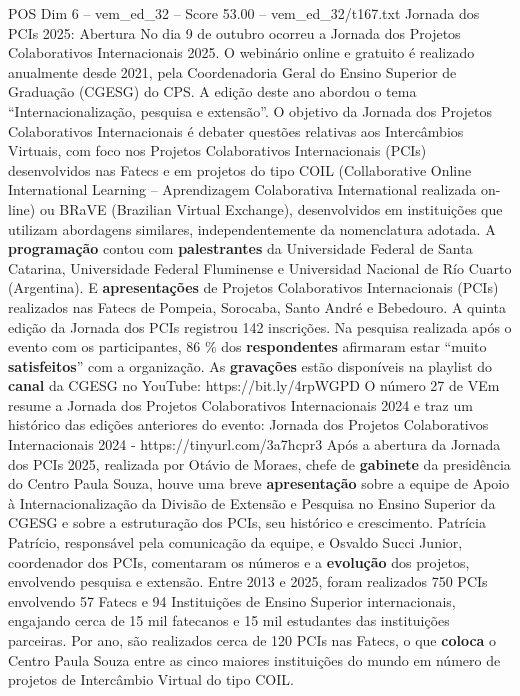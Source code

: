 \begin{textsample}{POS Dim 6 – vem\_ed\_32 – Score 53.00 – vem\_ed\_32/t167.txt}  \label{ex:f6_pos_005}
Jornada dos PCIs 2025: Abertura No dia 9 de outubro ocorreu a Jornada dos Projetos Colaborativos Internacionais 2025.
O webinário online e gratuito é realizado anualmente desde 2021, pela Coordenadoria Geral do Ensino Superior de Graduação (CGESG) do CPS.
A edição deste ano abordou o tema “Internacionalização, pesquisa e extensão”.
O objetivo da Jornada dos Projetos Colaborativos Internacionais é debater questões relativas aos Intercâmbios Virtuais, com foco nos Projetos Colaborativos Internacionais (PCIs) desenvolvidos nas Fatecs e em projetos do tipo COIL (Collaborative Online International Learning – Aprendizagem Colaborativa International realizada on-line) ou BRaVE (Brazilian Virtual Exchange), desenvolvidos em instituições que utilizam abordagens similares, independentemente da nomenclatura adotada.
A \textbf{programação} contou com \textbf{palestrantes} da Universidade Federal de Santa Catarina, Universidade Federal Fluminense e Universidad Nacional de Río Cuarto (Argentina).
E \textbf{apresentações} de Projetos Colaborativos Internacionais (PCIs) realizados nas Fatecs de Pompeia, Sorocaba, Santo André e Bebedouro.
A quinta edição da Jornada dos PCIs registrou 142 inscrições.
Na pesquisa realizada após o evento com os participantes, 86 \% dos \textbf{respondentes} afirmaram estar “muito \textbf{satisfeitos}” com a organização.
As \textbf{gravações} estão disponíveis na playlist do \textbf{canal} da CGESG no YouTube: https://bit.ly/4rpWGPD O número 27 de VEm resume a Jornada dos Projetos Colaborativos Internacionais 2024 e traz um histórico das edições anteriores do evento: Jornada dos Projetos Colaborativos Internacionais 2024 - https://tinyurl.com/3a7hcpr3 Após a abertura da Jornada dos PCIs 2025, realizada por Otávio de Moraes, chefe de \textbf{gabinete} da presidência do Centro Paula Souza, houve uma breve \textbf{apresentação} sobre a equipe de Apoio à Internacionalização da Divisão de Extensão e Pesquisa no Ensino Superior da CGESG e sobre a estruturação dos PCIs, seu histórico e crescimento.
Patrícia Patrício, responsável pela comunicação da equipe, e Osvaldo Succi Junior, coordenador dos PCIs, comentaram os números e a \textbf{evolução} dos projetos, envolvendo pesquisa e extensão.
Entre 2013 e 2025, foram realizados 750 PCIs envolvendo 57 Fatecs e 94 Instituições de Ensino Superior internacionais, engajando cerca de 15 mil fatecanos e 15 mil estudantes das instituições parceiras.
Por ano, são realizados cerca de 120 PCIs nas Fatecs, o que \textbf{coloca} o Centro Paula Souza entre as cinco maiores instituições do mundo em número de projetos de Intercâmbio Virtual do tipo COIL.

\end{textsample}
